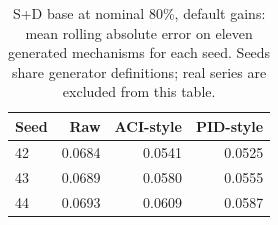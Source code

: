 \begin{table}[htbp]\centering\footnotesize
\caption{S+D base at nominal 80\%, default gains: mean rolling absolute error on eleven generated mechanisms for each seed. Seeds share generator definitions; real series are excluded from this table.}
\label{tab:seeds}
\begin{tabular}{lrrr}
\toprule
Seed & Raw & ACI-style & PID-style\\\midrule
42 & 0.0684 & 0.0541 & 0.0525\\
43 & 0.0689 & 0.0580 & 0.0555\\
44 & 0.0693 & 0.0609 & 0.0587\\
\bottomrule\end{tabular}\end{table}
